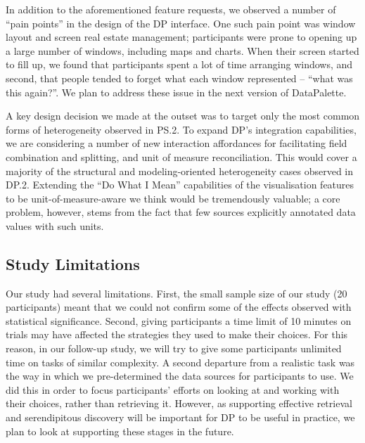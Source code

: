 \documentclass{sigchi}
\begin{document}
In addition to the aforementioned feature requests, we observed a number of ``pain points'' in the design of the DP interface.  One such pain point was window layout and screen real estate management; participants were prone to opening up a large number of windows, including maps and charts.  When their screen started to fill up, we found that participants spent a lot of time arranging windows, and second, that people tended to forget what each window represented -- ``what was this again?''.  We plan to address these issue in the next version of DataPalette.

A key design decision we made at the outset was to target only the most common forms of heterogeneity observed in PS.2.  To expand DP's integration capabilities, we are considering a number of new interaction affordances for facilitating field combination and splitting, and unit of measure reconciliation.  This would cover a majority of the structural and modeling-oriented heterogeneity cases observed in DP.2.  Extending the ``Do What I Mean'' capabilities of the visualisation features to be unit-of-measure-aware we think would be tremendously valuable; a core problem, however, stems from the fact that few sources explicitly annotated data values with such units.

\subsection{Study Limitations}

Our study had several limitations.  First, the small sample size of our study (20 participants) meant that we could not confirm some of the effects observed with statistical significance.  Second, giving participants a time limit of 10 minutes on trials may have affected the strategies they used to make their choices.  For this reason, in our follow-up study, we will try to give some participants unlimited time on tasks of similar complexity.  A second departure from a realistic task was the way in which we pre-determined the data sources for participants to use.  We did this in order to focus participants' efforts on looking at and working with their choices, rather than retrieving it.  However, as supporting effective retrieval and serendipitous discovery will be important for DP to be useful in practice, we plan to look at supporting these stages in the future. 
\end{document}
